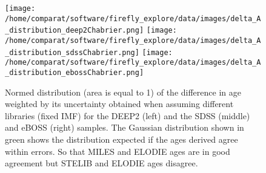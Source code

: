 \documentclass[onecolumn]{aa}
\begin{document}
\begin{figure}
\begin{center}
\caption{\label{fig:distributions:MwA} 
Normed distribution (area is equal to 1) of the difference in age weighted by its uncertainty obtained when assuming different libraries (fixed IMF) for the DEEP2 (left) and the SDSS (middle) and eBOSS (right) samples. The Gaussian distribution shown in green shows the distribution expected if the ages derived agree within errors. So that MILES and ELODIE ages are in good agreement but STELIB and ELODIE ages disagree.}  
\texttt{[image: /home/comparat/software/firefly\_explore/data/images/delta\_A\_distribution\_deep2Chabrier.png]}
\hspace*{-0.5cm}
\texttt{[image: /home/comparat/software/firefly\_explore/data/images/delta\_A\_distribution\_sdssChabrier.png]}
\hspace*{-0.5cm}
\texttt{[image: /home/comparat/software/firefly\_explore/data/images/delta\_A\_distribution\_ebossChabrier.png]}
\end{center}
\end{figure}
\end{document}
